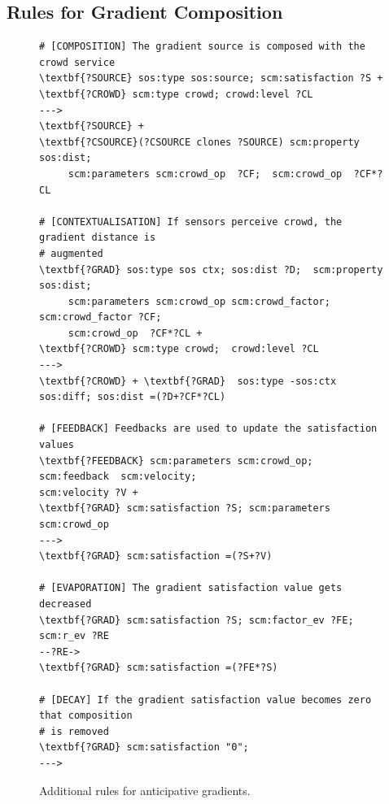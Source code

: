 \documentclass[12pt,a4paper,twoside,openright]{book}
\begin{document}
\subsection{Rules for Gradient Composition}

\begin{figure}[t!]\vspace{10pt}
{\footnotesize \begin{Verbatim}[frame=single, commandchars=\\\{\}, label={\small \bf Eco-laws for gradient contextualisation}]
# [COMPOSITION] The gradient source is composed with the crowd service
\textbf{?SOURCE} sos:type sos:source; scm:satisfaction ?S +
\textbf{?CROWD} scm:type crowd; crowd:level ?CL 
---> 
\textbf{?SOURCE} +
\textbf{?CSOURCE}(?CSOURCE clones ?SOURCE) scm:property sos:dist;
     scm:parameters scm:crowd_op  ?CF;  scm:crowd_op  ?CF*?CL

# [CONTEXTUALISATION] If sensors perceive crowd, the gradient distance is
# augmented
\textbf{?GRAD} sos:type sos ctx; sos:dist ?D;  scm:property sos:dist; 
     scm:parameters scm:crowd_op scm:crowd_factor; scm:crowd_factor ?CF;
     scm:crowd_op  ?CF*?CL +
\textbf{?CROWD} scm:type crowd;  crowd:level ?CL 
--->
\textbf{?CROWD} + \textbf{?GRAD}  sos:type -sos:ctx sos:diff; sos:dist =(?D+?CF*?CL)

# [FEEDBACK] Feedbacks are used to update the satisfaction values
\textbf{?FEEDBACK} scm:parameters scm:crowd_op; scm:feedback  scm:velocity;
scm:velocity ?V +
\textbf{?GRAD} scm:satisfaction ?S; scm:parameters scm:crowd_op 
--->
\textbf{?GRAD} scm:satisfaction =(?S+?V)

# [EVAPORATION] The gradient satisfaction value gets decreased
\textbf{?GRAD} scm:satisfaction ?S; scm:factor_ev ?FE; scm:r_ev ?RE
--?RE->
\textbf{?GRAD} scm:satisfaction =(?FE*?S)

# [DECAY] If the gradient satisfaction value becomes zero that composition
# is removed
\textbf{?GRAD} scm:satisfaction "0"; 
--->

\end{Verbatim}
}
\vspace{-10pt}\caption{Additional rules for anticipative gradients.}\label{laws:crowd}
\end{figure}
\end{document}
